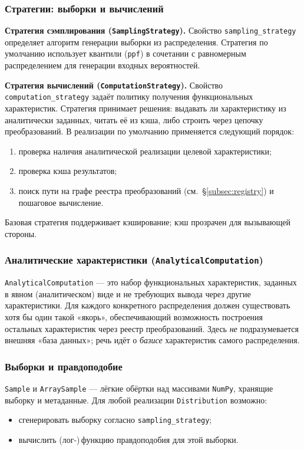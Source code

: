 \subsubsection{Стратегии: выборки и вычислений}

\textbf{Стратегия сэмплирования (\texttt{SamplingStrategy}).}
Свойство \texttt{sampling\_strategy} определяет алгоритм генерации выборки из распределения. Стратегия по умолчанию использует квантили (\texttt{ppf}) в сочетании с равномерным распределением для генерации входных вероятностей.

\textbf{Стратегия вычислений (\texttt{ComputationStrategy}).}
Свойство \texttt{computation\_strategy} задаёт политику получения функциональных характеристик. Стратегия принимает решения: выдавать ли характеристику из аналитически заданных, читать её из кэша, либо строить через цепочку преобразований. В реализации по умолчанию применяется следующий порядок:
\begin{enumerate}
  \item проверка наличия аналитической реализации целевой характеристики;
  \item проверка кэша результатов;
  \item поиск пути на графе реестра преобразований (см.~\S\ref{subsec:registry}) и пошаговое вычисление.
\end{enumerate}
Базовая стратегия поддерживает кэширование; кэш прозрачен для вызывающей стороны.

\subsubsection{Аналитические характеристики (\texttt{AnalyticalComputation})}

\texttt{AnalyticalComputation} — это набор функциональных характеристик, заданных в явном (аналитическом) виде и не требующих вывода через другие характеристики. Для каждого конкретного распределения должен существовать хотя бы один такой «якорь», обеспечивающий возможность построения остальных характеристик через реестр преобразований. Здесь \emph{не} подразумевается внешняя «база данных»; речь идёт о \emph{базисе} характеристик самого распределения.

\subsubsection{Выборки и правдоподобие}

\texttt{Sample} и \texttt{ArraySample} — лёгкие обёртки над массивами \texttt{NumPy}, хранящие выборку и метаданные. Для любой реализации \texttt{Distribution} возможно:
\begin{itemize}
  \item сгенерировать выборку согласно \texttt{sampling\_strategy};
  \item вычислить (лог-)\,функцию правдоподобия для этой выборки.
\end{itemize}

